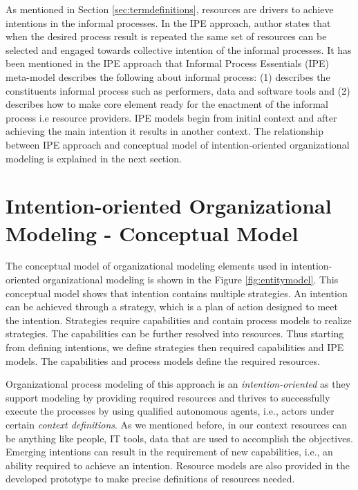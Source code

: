 As mentioned in Section \ref{sec:termdefinitions}, resources are drivers to achieve intentions in the informal processes. In the IPE approach, author states that when the desired process result is repeated the same set of resources can be selected and engaged towards collective intention of the informal processes. It has been mentioned in the IPE approach that Informal Process Essentials (IPE) meta-model describes the following about informal process: (1) describes the constituents informal process such as performers, data and software tools and (2) describes how to make core element ready for the enactment of the informal process i.e resource providers. IPE models begin from initial context and after achieving the main intention it results in another context. The relationship between IPE approach and conceptual model of intention-oriented organizational modeling is explained in the next section.

\section{Intention-oriented Organizational Modeling - Conceptual Model}
\label{sec:entitytypesrepresentation}
The conceptual model of organizational modeling elements used in intention-oriented organizational modeling is shown in the Figure \ref{fig:entitymodel}. This conceptual model shows that intention contains multiple strategies. An intention can be achieved through a strategy, which is a plan of action designed to meet the intention. Strategies require capabilities and contain process models to realize strategies. The capabilities can be further resolved into resources. Thus starting from defining intentions, we define strategies then required capabilities and IPE models. The capabilities and process models define the required resources. 

Organizational process modeling of this approach is an \textit{intention-oriented} as they support modeling by providing required resources and thrives to successfully execute the processes by using qualified autonomous agents, i.e., actors under certain \textit{context definitions}. As we mentioned before, in our context resources can be anything like people, IT tools, data that are used to accomplish the objectives. Emerging intentions can result in the requirement of new capabilities, i.e., an ability required to achieve an intention. Resource models are also provided in the developed prototype to make precise definitions of resources needed.

